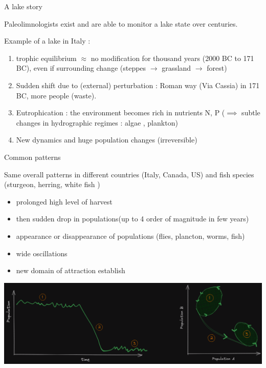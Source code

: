 \documentclass[11,aspectratio=1610]{beamer}
\begin{document}
\begin{frame}{A lake story }



\alert{Paleolimnologists}  exist and are able to monitor a lake state over centuries.

\vfill

Example of a lake in Italy : 


\begin{footnotesize}
\begin{enumerate}
\item \alert{trophic equilibrium} $\approx$ no modification  for thousand years (2000 BC to 171 BC), even if surrounding change (steppes $\rightarrow$ grassland $\rightarrow$ forest)
\item Sudden \alert{shift} due to (external) perturbation  : Roman way (Via Cassia) in 171 BC, more people (waste). 
\item \alert{Eutrophication} : the environment becomes rich in nutrients N, P ($\implies$ subtle changes in hydrographic regimes : algae , plankton)  
\item \alert{New dynamics} and huge population changes (irreversible)
\end{enumerate}
\end{footnotesize}
\end{frame}





\begin{frame}{Common patterns}

\begin{footnotesize}
Same overall patterns in different countries (Italy, Canada, US) and fish species (sturgeon, herring, white fish ) 

\begin{itemize}
  \item prolonged high level of harvest 
  \item then  \alert{sudden drop} in populations(up to 4 order of magnitude in few years)
  \item appearance or disappearance of populations (flies, plancton, worms, fish)
  \item wide oscillations
  \item new domain of attraction establish 
\end{itemize}
\end{footnotesize}
\centering
\includegraphics[height=0.4\textheight]{img/pattern_in_lake.png}


\end{frame}
\end{document}
